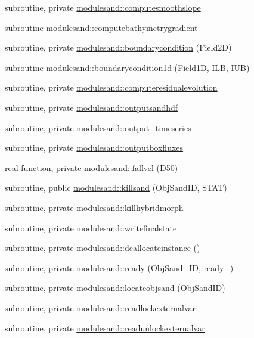 \begin{DoxyCompactItemize}
subroutine, private \mbox{\hyperlink{namespacemodulesand_a2490457b0368770e3389caa5b86fbcec}{modulesand\+::computesmoothslope}}
\item 
subroutine \mbox{\hyperlink{namespacemodulesand_a4fb9cf38c8854f5719cd1bd9633891ce}{modulesand\+::computebathymetrygradient}}
\item 
subroutine, private \mbox{\hyperlink{namespacemodulesand_a24a6518a059721913dd87b9b1d7f2c4d}{modulesand\+::boundarycondition}} (Field2D)
\item 
subroutine \mbox{\hyperlink{namespacemodulesand_ac5edc4e9b694ab004e67e47cc9a22566}{modulesand\+::boundarycondition1d}} (Field1D, I\+LB, I\+UB)
\item 
subroutine, private \mbox{\hyperlink{namespacemodulesand_a4577ec7b0d16f959a488db5280c61154}{modulesand\+::computeresidualevolution}}
\item 
subroutine, private \mbox{\hyperlink{namespacemodulesand_af453c334bacf72e34c80ff7d4a71fb1a}{modulesand\+::outputsandhdf}}
\item 
subroutine, private \mbox{\hyperlink{namespacemodulesand_a88edcbeb020c6e5308ed19af4b7d4d46}{modulesand\+::output\+\_\+timeseries}}
\item 
subroutine, private \mbox{\hyperlink{namespacemodulesand_a587b88656b78d72a4c1f4bfedcf366c3}{modulesand\+::outputboxfluxes}}
\item 
real function, private \mbox{\hyperlink{namespacemodulesand_a81b51403d378065ebb345027ab24a5af}{modulesand\+::fallvel}} (D50)
\item 
subroutine, public \mbox{\hyperlink{namespacemodulesand_a29c3265b645ec50590d4d13545918a44}{modulesand\+::killsand}} (Obj\+Sand\+ID, S\+T\+AT)
\item 
subroutine, private \mbox{\hyperlink{namespacemodulesand_a213ec97f902c200fd1bb472fe1490e92}{modulesand\+::killhybridmorph}}
\item 
subroutine, private \mbox{\hyperlink{namespacemodulesand_afb972f404f3d402212f2af24b34ddb90}{modulesand\+::writefinalstate}}
\item 
subroutine, private \mbox{\hyperlink{namespacemodulesand_afe6b0604957817eebf137ff6997e6351}{modulesand\+::deallocateinstance}} ()
\item 
subroutine, private \mbox{\hyperlink{namespacemodulesand_a663024ee5ee19e5c00cce90c271934ea}{modulesand\+::ready}} (Obj\+Sand\+\_\+\+ID, ready\+\_\+)
\item 
subroutine, private \mbox{\hyperlink{namespacemodulesand_a1cc021f53fc9b3dfb942f3a272588046}{modulesand\+::locateobjsand}} (Obj\+Sand\+ID)
\item 
subroutine, private \mbox{\hyperlink{namespacemodulesand_a3bbda76d81b4711c3b088303a6953f52}{modulesand\+::readlockexternalvar}}
\item 
subroutine, private \mbox{\hyperlink{namespacemodulesand_af758b46396eb7217217ae5f30679be76}{modulesand\+::readunlockexternalvar}}
\end{DoxyCompactItemize}

